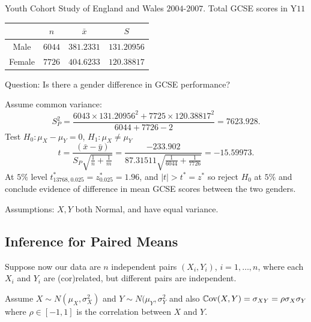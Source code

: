 \documentclass[10pt, a4paper]{article}
\begin{document}
\begin{example}
    Youth Cohort Study of England and Wales $2004$-$2007$.
    Total GCSE scores in Y$11$
    \begin{table}[ht]
        \centering
        \begin{tabular}{c|c|c|c}
             \phantom{} & $n$ & $\bar{x}$ & $S$ \\
             \hline
             Male & $6044$ & $381.2331$ & $131.20956$ \\
             Female & $7726$ & $404.6233$ & $120.38817$
        \end{tabular}
    \end{table}
    Question:
    Is there a gender difference in GCSE performance?

    Assume common variance:
    \[
    S_{P} ^ 2 = \frac{6043 \times 131.20956 ^ 2 + 7725 \times 120.38817 ^ 2}{6044 + 7726 - 2} = 7623.928.
    \]
    Test $H_0 : \mu_{X} - \mu_{Y} = 0$,
    $H_1 : \mu_{X} \neq \mu_{Y}$
    \[
    t = \frac{(\bar{x} - \bar{y})}{S_{P}\sqrt{\frac{1}{n} + \frac{1}{m}}} = \frac{-233.902}{87.31511\sqrt{\frac{1}{6044} + \frac{1}{7726}}} = -15.59973.
    \]
    At $5\%$ level $t_{13768, 0.025}^{*} = z_{0.025}^{*} = 1.96$,
    and $|t| > t ^ {*} = z ^ {*}$ so reject $H_0$ at $5\%$ and conclude evidence of difference in mean GCSE scores between the two genders.

    Assumptions:
    $X, Y$ both Normal,
    and have equal variance.
\end{example}

\subsection{Inference for Paired Means}
Suppose now our data are $n$ independent pairs $(X_i, Y_i)$,
$i = 1, \dotsc, n$,
where each $X_i$ and $Y_i$ are (cor)related,
but different pairs are independent.

Assume $X \sim N(\mu_{X}, \sigma_{X} ^ 2)$ and $Y \sim N(\mu_{Y}, \sigma_{Y} ^ 2$ and also $\mathbb{C}\mathrm{ov}(X, Y) = \sigma_{XY} = \rho\sigma_{X}\sigma_{Y}$ where $\rho \in [-1, 1]$ is the correlation between $X$ and $Y$.
\end{document}
